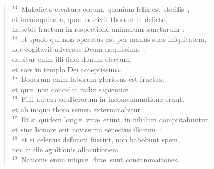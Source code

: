 \begin{flushleft}
\begin{verse}
${}^{13}$~Maledicta creatura eorum, quoniam felix est sterilis~;\\ et incoinquinata, qu\ae\ nescivit thorum in delicto,\\ habebit fructum in respectione animarum sanctarum~;\\
${}^{14}$~et spado qui non operatus est per manus suas iniquitatem,\\ nec cogitavit adversus Deum nequissima~:\\ dabitur enim illi fidei donum electum,\\ et sors in templo Dei acceptissima.\\
${}^{15}$~Bonorum enim laborum gloriosus est fructus,\\ et qu\ae\ non concidat radix sapienti\ae .\\
${}^{16}$~Filii autem adulterorum in inconsummatione erunt,\\ et ab iniquo thoro semen exterminabitur.\\
${}^{17}$~Et si quidem long\ae\ vit\ae\ erunt, in nihilum computabuntur,\\ et sine honore erit novissima senectus illorum~:\\
${}^{18}$~et si celerius defuncti fuerint, non habebunt spem,\\ nec in die agnitionis allocutionem.\\
${}^{19}$~Nationis enim iniqu\ae\ dir\ae\ sunt consummationes.\end{verse}\end{flushleft}


